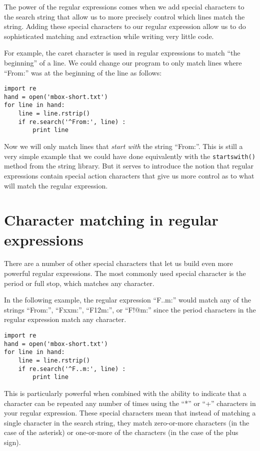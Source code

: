 The power of the regular expressions comes when we add special characters to the search string
that allow us to more precisely control which lines match the string.  Adding these special
characters to our regular expression allow us to do sophisticated matching and extraction while
writing very little code.

For example, the caret character is used in regular 
expressions to match ``the beginning'' of a line.
We could change our program to only match 
lines where ``From:'' was at the beginning of the line as follows:

\beforeverb
\begin{verbatim}
import re
hand = open('mbox-short.txt')
for line in hand:
    line = line.rstrip()
    if re.search('^From:', line) :
        print line
\end{verbatim}
\afterverb
%
Now we will only match lines that {\em start with} the string ``From:''.  This is still a very
simple example that we could have done equivalently with the {\tt startswith()} method from
the string library.  But it serves to introduce the notion that regular expressions contain
special action characters that give us more control as to what will match the regular expression.

\section{Character matching in regular expressions}

There are a number of other special characters that let us build even more powerful regular
expressions.  The most commonly used special character is the period or full stop, which matches
any character.

In the following example, the regular expression ``F..m:'' would match any of the strings
``From:'', ``Fxxm:'', ``F12m:'', or ``F!@m:'' since the period characters in the regular
expression match any character.

\beforeverb
\begin{verbatim}
import re
hand = open('mbox-short.txt')
for line in hand:
    line = line.rstrip()
    if re.search('^F..m:', line) :
        print line
\end{verbatim}
\afterverb
%
This is particularly powerful when combined with the ability to indicate that a character can
be repeated any number of times using the ``*'' or ``+'' characters in your regular expression.
These special characters mean that instead of matching a single character in the search string,
they match zero-or-more characters (in the case of the asterisk) or one-or-more of the characters
(in the case of the plus sign).


